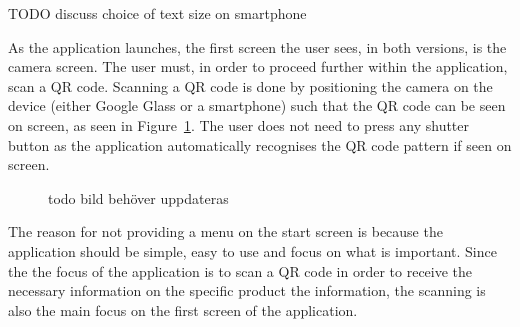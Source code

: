 TODO discuss choice of text size on smartphone

As the application launches, the first screen the user sees, in both versions, is the camera screen. The user must, in order to proceed further within the application, scan a QR code. Scanning a QR code is done by positioning the camera on the device (either Google Glass or a smartphone) such that the QR code can be seen on screen, as seen in Figure~\ref{glassDemoQR}. The user does not need to press any shutter button as the application automatically recognises the QR code pattern if seen on screen.%

	
	\begin{figure}[ht!]
		\centering
   		 \qquad
   		 \qquad
		\caption{todo bild behöver uppdateras}
		\label{glassDemoQR}
	\end{figure}

The reason for not providing a menu on the start screen is because the application should be simple, easy to use and focus on what is important. Since the the focus of the application is to scan a QR code in order to receive the necessary information on the specific product the information, the scanning is also the main focus on the first screen of the application.

